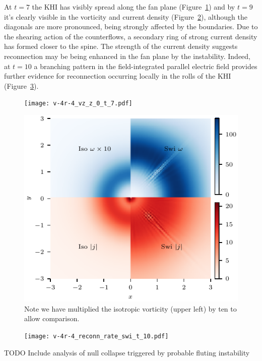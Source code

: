 At $t=7$ the KHI has visibly spread along the fan plane (Figure~\ref{fig:v-4r-4_vz_z_0_t_7}) and by $t=9$ it's clearly visible in the vorticity and current density (Figure~\ref{fig:v-4r-4_vorticity_current_ring_t_9}), although the diagonals are more pronounced, being strongly affected by the boundaries. Due to the shearing action of the counterflows, a secondary ring of strong current density has formed closer to the spine. The strength of the current density suggests reconnection may be being enhanced in the fan plane by the instability. Indeed, at $t=10$ a branching pattern in the field-integrated parallel electric field provides further evidence for reconnection occurring locally in the rolls of the KHI (Figure~\ref{fig:v-4r-4_reconn_rate_swi_t_10}).

\begin{figure}[t]
  \centering
  \texttt{[image: v-4r-4\_vz\_z\_0\_t\_7.pdf]}
  \caption{}%
  \label{fig:v-4r-4_vz_z_0_t_7}
\end{figure}

\begin{figure}[t]
  \centering
  \includegraphics[width=0.48\linewidth]{v-4r-4_vorticity_current_ring_t_9}
  \caption{Note we have multiplied the isotropic vorticity (upper left) by ten to allow comparison.}%
  \label{fig:v-4r-4_vorticity_current_ring_t_9}
\end{figure}

\begin{figure}[t]
  \centering
  \texttt{[image: v-4r-4\_reconn\_rate\_swi\_t\_10.pdf]}
  \caption{}%
  \label{fig:v-4r-4_reconn_rate_swi_t_10}
\end{figure}

TODO Include analysis of null collapse triggered by probable fluting instability



